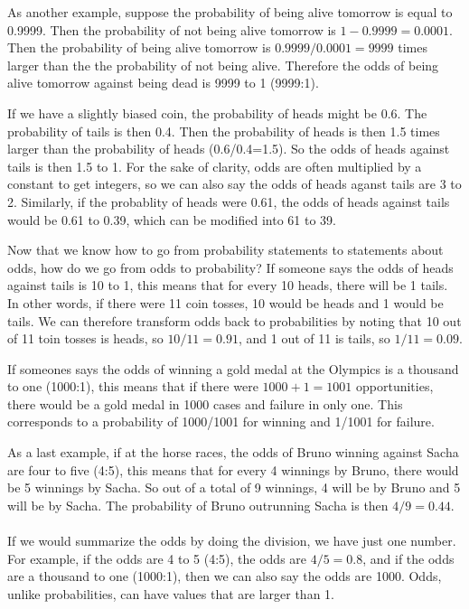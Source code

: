 \documentclass[]{report}\usepackage[]{graphicx}\usepackage[]{color}
\begin{document}
As another example, suppose the probability of being alive tomorrow is equal to 0.9999. Then the probability of not being alive tomorrow is $1-0.9999=0.0001$. Then the probability of being alive tomorrow is $0.9999/0.0001=9999$ times larger than the the probability of not being alive. Therefore the odds of being alive tomorrow against being dead is 9999 to 1 (9999:1).

If we have a slightly biased coin, the probability of heads might be 0.6. The probability of tails is then 0.4. Then the probability of heads is then 1.5 times larger than the probability of heads (0.6/0.4=1.5). So the odds of heads against tails is then 1.5 to 1. For the sake of clarity, odds are often multiplied by a constant to get integers, so we can also say the odds of heads aganst tails are 3 to 2. Similarly, if the probablity of heads were 0.61, the odds of heads against tails would be 0.61 to 0.39, which can be modified into 61 to 39.

Now that we know how to go from probability statements to statements about odds, how do we go from odds to probability? If someone says the odds of heads against tails is 10 to 1, this means that for every 10 heads, there will be 1 tails. In other words, if there were 11 coin tosses, 10 would be heads and 1 would be tails. We can therefore transform odds back to probabilities by noting that 10 out of 11 toin tosses is heads, so $10/11 = 0.91$, and 1 out of 11 is tails, so $1/11=0.09$.

If someones says the odds of winning a gold medal at the Olympics is a thousand to one (1000:1), this means that if there were $1000+1=1001$ opportunities, there would be a gold medal in 1000 cases and failure in only one. This corresponds to a probability of 1000/1001 for winning and 1/1001 for failure.

As a last example, if at the horse races, the odds of Bruno winning against Sacha are four to five (4:5), this means that for every 4 winnings by Bruno, there would be 5 winnings by Sacha. So out of a total of 9 winnings, 4 will be by Bruno and 5 will be by Sacha. The probability of Bruno outrunning Sacha is then $4/9=0.44$.
\\
\\
If we would summarize the odds by doing the division, we have just one number. For example, if the odds are 4 to 5 (4:5), the odds are $4/5=0.8$, and if the odds are a thousand to one (1000:1), then we can also say the odds are 1000. Odds, unlike probabilities, can have values that are larger than 1. 
\end{document}
